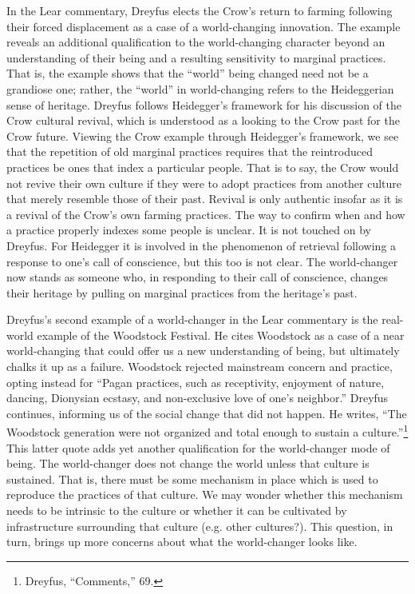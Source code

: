 In the Lear commentary, Dreyfus elects the Crow's return to farming
following their forced displacement as a case of a world-changing
innovation. The example reveals an additional qualification to the
world-changing character beyond an understanding of their being and a
resulting sensitivity to marginal practices. That is, the example shows
that the ``world'' being changed need not be a grandiose one; rather,
the ``world'' in world-changing refers to the Heideggerian sense of
heritage. Dreyfus follows Heidegger's framework for his discussion of
the Crow cultural revival, which is understood as a looking to the Crow
past for the Crow future. Viewing the Crow example through Heidegger's
framework, we see that the repetition of old marginal practices requires
that the reintroduced practices be ones that index a particular people.
That is to say, the Crow would not revive their own culture if they were
to adopt practices from another culture that merely resemble those of
their past. Revival is only authentic insofar as it is a revival of the
Crow's own farming practices. The way to confirm when and how a practice
properly indexes some people is unclear. It is not touched on by
Dreyfus. For Heidegger it is involved in the phenomenon of retrieval
following a response to one's call of conscience, but this too is not
clear. The world-changer now stands as someone who, in responding to
their call of conscience, changes their heritage by pulling on marginal
practices from the heritage's past.

Dreyfus's second example of a world-changer in the Lear commentary is
the real-world example of the Woodstock Festival. He cites Woodstock as
a case of a near world-changing that could offer us a new understanding
of being, but ultimately chalks it up as a failure. Woodstock rejected
mainstream concern and practice, opting instead for ``Pagan practices,
such as receptivity, enjoyment of nature, dancing, Dionysian ecstasy,
and non-exclusive love of one's neighbor.'' Dreyfus continues, informing
us of the social change that did not happen. He writes, ``The Woodstock
generation were not organized and total enough to sustain a
culture.''\footnote{Dreyfus, ``Comments,'' 69.} This latter quote adds
yet another qualification for the world-changer mode of being. The
world-changer does not change the world unless that culture is
sustained. That is, there must be some mechanism in place which is used
to reproduce the practices of that culture. We may wonder whether this
mechanism needs to be intrinsic to the culture or whether it can be
cultivated by infrastructure surrounding that culture (e.g. other
cultures?). This question, in turn, brings up more concerns about what
the world-changer looks like.

